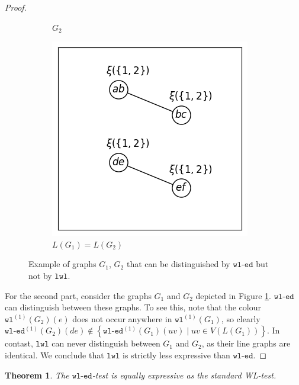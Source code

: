 \documentclass{article}
\newtheorem{theorem}{Theorem}
\newcommand{\set}[1]{\left\{#1\right\}}
\newcommand{\iter}[1]{^{(#1)}}
\newcommand{\wl}{\texttt{wl}}
\newcommand{\wledge}{\texttt{wl-ed}}
\newcommand{\lwl}{\texttt{lwl}}
\begin{document}
\begin{proof}
\begin{figure}[ht]
\begin{subfigure}[b]{0.3\textwidth}
            \caption{$G_2$}
        \end{subfigure}
        \hfill
        \begin{subfigure}[b]{0.3\textwidth}
            \includegraphics[width=\textwidth]{figures/lwl vs wl-ed/L(G1)-L(G2).png}
            \caption{$L(G_1)=L(G_2)$}
        \end{subfigure}
        \caption{Example of graphs $G_1$, $G_2$ that can be distinguished by $\wledge$ but not by $\lwl$.}
        \label{fig:lwl-wledge-counterexample}
    \end{figure}

    For the second part, consider the graphs $G_1$ and $G_2$ depicted in Figure \ref{fig:lwl-wledge-counterexample}.
    $\wledge$ can distinguish between these graphs. To see this, note that the colour $\wl\iter{1}(G_2)(e)$ does not occur anywhere in $\wl\iter{1}(G_1)$, so clearly $\wledge\iter{1}(G_2)(de) \notin \set{\wledge\iter{1}(G_1)(uv) \mid uv\in V(L(G_1))}$.
    In contast, $\lwl$ can never distinguish between $G_1$ and $G_2$, as their line graphs are identical. We conclude that $\lwl$ is strictly less expressive than $\wledge$.
\end{proof}


\begin{theorem} \label{thm:wledge-equal-to-wl}
    The $\wledge$-test is equally expressive as the standard WL-test.
\end{theorem}
\end{document}
